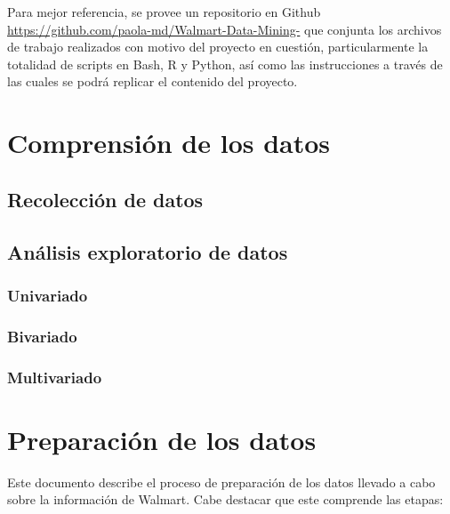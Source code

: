 \documentclass[]{book}
\begin{document}
Para mejor referencia, se provee un repositorio en Github \url{https://github.com/paola-md/Walmart-Data-Mining-} que conjunta los archivos de trabajo realizados con motivo del proyecto en cuestión, particularmente la totalidad de scripts en Bash, R y Python, así como las instrucciones a través de las cuales se podrá replicar el contenido del proyecto.

\hypertarget{comprensiuxf3n-de-los-datos}{%
\chapter{Comprensión de los datos}\label{comprensiuxf3n-de-los-datos}}

\hypertarget{recolecciuxf3n-de-datos}{%
\section{Recolección de datos}\label{recolecciuxf3n-de-datos}}

\hypertarget{anuxe1lisis-exploratorio-de-datos}{%
\section{Análisis exploratorio de datos}\label{anuxe1lisis-exploratorio-de-datos}}

\hypertarget{univariado}{%
\subsection{Univariado}\label{univariado}}

\hypertarget{bivariado}{%
\subsection{Bivariado}\label{bivariado}}

\hypertarget{multivariado}{%
\subsection{Multivariado}\label{multivariado}}

\hypertarget{preparaciuxf3n-de-los-datos}{%
\chapter{Preparación de los datos}\label{preparaciuxf3n-de-los-datos}}

Este documento describe el proceso de preparación de los datos llevado a cabo sobre la información de Walmart. Cabe destacar que este comprende las etapas:
\end{document}
